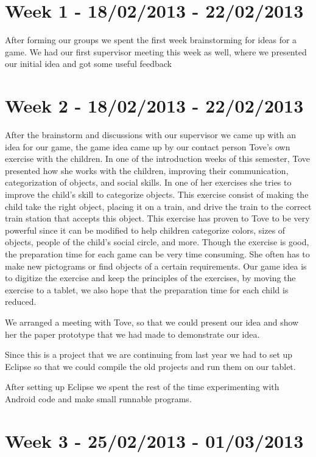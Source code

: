 \section*{Week 1 - 18/02/2013 - 22/02/2013}

After forming our groups we spent the first week brainstorming for ideas for a game. We had our first supervisor meeting this week as well, where we presented our initial idea and got some useful feedback

\section*{Week 2 - 18/02/2013 - 22/02/2013} 
\label{processweek2}
After the brainstorm and discussions with our supervisor we came up with an idea for our game, the game idea came up by our contact person Tove's own exercise with the children. In one of the introduction weeks of this semester, Tove presented how she works with the children, improving their communication, categorization of objects, and social skills. In one of her exercises she tries to improve the child's skill to categorize objects. This exercise consist of making the child take the right object, placing it on a train, and drive the train to the correct train station that accepts this object. This exercise has proven to Tove to be very powerful since it can be modified to help children categorize colors, sizes of objects, people of the child's social circle, and more. Though the exercise is good, the preparation time for each game can be very time consuming. She often has to make new pictograms or find objects of a certain requirements. Our game idea is to digitize the exercise and keep the principles of the exercises, by moving the exercise to a tablet, we also hope that the preparation time for each child is reduced.

We arranged a meeting with Tove, so that we could present our idea and show her the paper prototype that we had made to demonstrate our idea.%

Since this is a project that we are continuing from last year we had to set up Eclipse so that we could compile the old projects and run them on our tablet. 

After setting up Eclipse we spent the rest of the time experimenting with Android code and make small runnable programs. 

\section*{Week 3 - 25/02/2013 - 01/03/2013}

